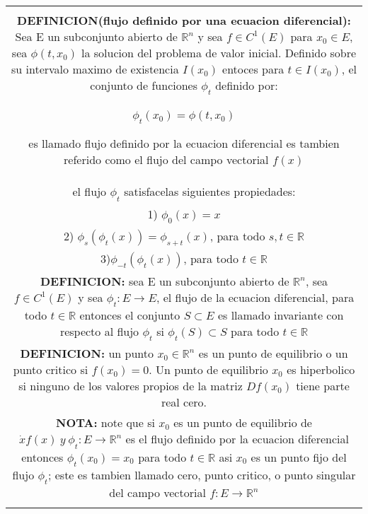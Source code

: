 \begin{center}
\begin{tabular}{c}
{\begin{minipage}[][4cm][c]{0.8\linewidth}
\begin{center}
\begin{equation}
\left\{
\begin{array}{lcc}
\dot{x}=f(x,\mu )\\
x(0)=y
\end{array}\right.
\end{equation}
\end{center} 
 tiene una unica solucion $u(t,y,\mu )$ con $u\in C^{1}(G)$ donde $G=[-a,a]* N_{\delta}(x_{0})* \in N_{\delta}(\mu _{0})$\\
 \textbf{DEFINICION(flujo definido por una ecuacion diferencial):} Sea E un subconjunto abierto de $\mathbb{R}^{n}$ y sea $f\in C^{1}(E)$ para $x_{0}\in E$, sea $\phi (t,x_{0})$ la solucion del problema de valor inicial. Definido sobre su intervalo maximo de existencia $I(x_{0})$ entoces para $t\in I(x_{0})$, el conjunto de funciones $\phi _{t}$ definido por:\\
 \begin{center}
 $\phi _{t}(x_{0})= \phi (t,x_{0})$
\end{center}       
es llamado flujo definido por la ecuacion diferencial es tambien referido como el flujo del campo vectorial $f(x)$\\
el flujo $\phi _{t}$ satisfacelas siguientes propiedades:\\
1) $\phi _{0}(x)=x$\\
2) $\phi _{s}(\phi _{t}(x))=\phi _{s+t}(x)$, para todo $s,t\in \mathbb{R}$\\
3)$ \phi _{-t}(\phi _{t}(x))$, para todo $t\in \mathbb{R} $\\
\textbf{DEFINICION:} sea E un subconjunto abierto de $\mathbb{R}^{n}$, sea $f\in C^{1}(E)$ y sea $\phi _{t}:E\longrightarrow E $, el flujo de la ecuacion diferencial, para todo $t\in \mathbb{R}$ entonces el conjunto $ S\subset E$ es llamado invariante con respecto al flujo $\phi _{t}$ si $\phi _{t}(S)\subset S$ para todo $t\in \mathbb{R}$\\
\textbf{DEFINICION:} un punto $x_{0}\in \mathbb{R}^{n}$ es un punto de equilibrio o un punto critico si $f(x_{0})=0$. Un punto de equilibrio $x_{0}$ es hiperbolico si ninguno de los valores propios de la matriz $Df(x_{0})$ tiene parte real cero.\\
\textbf{NOTA:} note que si $x_{0}$ es un punto de equilibrio de $\dot{x} f(x) \ y\ \phi _{t}:E\longrightarrow \mathbb{R}^{n}$  es el flujo definido por la ecuacion diferencial entonces $\phi _{t}(x_{0})=x_{0}$ para todo $t\in \mathbb{R}$ asi $ x_{0}$ es un punto fijo del flujo $\phi _{t}$; este es tambien llamado cero, punto critico, o punto singular del campo vectorial $f:E\longrightarrow \mathbb{R}^{n}$\\

\end{minipage}}
\end{tabular}
\end{center}

